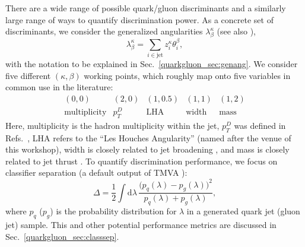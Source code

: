 \documentclass[11pt]{cernrep}
\begin{document}
There are a wide range of possible quark/gluon discriminants and a similarly large range of ways to quantify discrimination power.  As a concrete set of discriminants, we consider the generalized angularities $\lambda_\beta^\kappa$ \cite{Larkoski:2014pca} (see also \cite{Berger:2003iw,Almeida:2008yp,Ellis:2010rwa,Larkoski:2014uqa}),
\begin{equation}
\label{quarkgluon_eq:genang_intro}
\lambda^{\kappa}_{\beta} = \sum_{i \in \text{jet}} z_i^\kappa \theta_i^\beta,
\end{equation}
with the notation to be explained in Sec.~\ref{quarkgluon_sec:genang}.  We consider five different $(\kappa, \beta)$ working points, which roughly map onto five variables in common use in the literature:
\begin{equation}
\begin{array}{ccccc}
(0,0) & (2,0) & (1,0.5) & (1,1) & (1,2) \\
\text{multiplicity} &  p_T^D &  \text{LHA} & \text{width} & \text{mass}
\end{array}
\end{equation}
Here, multiplicity is the hadron multiplicity within the
jet, $p_T^D$ was defined in
Refs.~\cite{Pandolfi:1480598,Chatrchyan:2012sn}, LHA refers to the
``Les Houches Angularity'' (named after the venue of this workshop),
width is closely related to jet broadening
\cite{Catani:1992jc,Rakow:1981qn,Ellis:1986ig}, and mass is closely
related to jet thrust \cite{Farhi:1977sg}.  To quantify discrimination
performance, we focus on classifier separation (a default output of
TMVA \cite{2007physics...3039H}):
\begin{equation}
\label{quarkgluon_eq:deltadef_intro}
\Delta =  \frac{1}{2} \int \text{d} \lambda \, \frac{\bigl(p_q(\lambda) - p_g(\lambda)\bigr)^2}{p_q(\lambda) + p_g(\lambda)},
\end{equation}
where $p_q$ ($p_g$) is the probability distribution for $\lambda$ in a generated quark jet (gluon jet) sample.  This and other potential performance metrics are discussed in
Sec.~\ref{quarkgluon_sec:classsep}.
\end{document}
